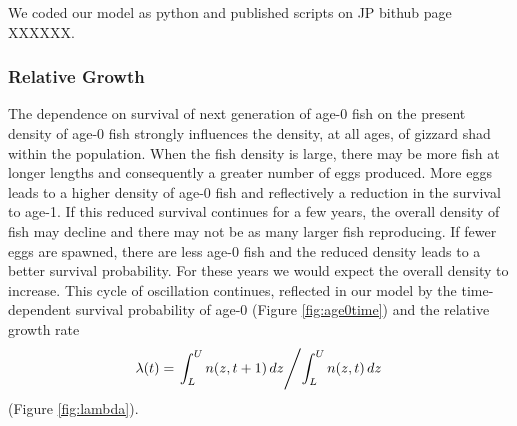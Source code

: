 \documentclass[11pt,oneside]{amsart}
\theoremstyle{definition}
\begin{document}
We coded our model as python and published scripts on JP bithub page XXXXXX.

\subsubsection{Relative Growth}
The dependence on survival of next generation of age-0 fish on the present density of age-0 fish strongly influences the density, at all ages, of gizzard shad within the population. When the fish density is large, there may be more fish at longer lengths and consequently a greater number of eggs produced.  More eggs leads to a higher density of age-0 fish and reflectively a reduction in the survival to age-1.  If this reduced survival continues for a few years, the overall density of fish may decline and there may not be as many larger fish reproducing.  If fewer eggs are spawned, there are less age-0 fish and the reduced density leads to a better survival probability.  For these years we would expect the overall density to increase.  This cycle of oscillation continues, reflected in our model by the time-dependent survival probability of age-0 (Figure \ref{fig:age0time}) and the relative growth rate 
$$ \lambda(t) = \left. \int_L^U n(z,t+1) \, dz \middle/ \int_L^U n(z,t) \, dz \right.$$ (Figure \ref{fig:lambda}).
\end{document}
